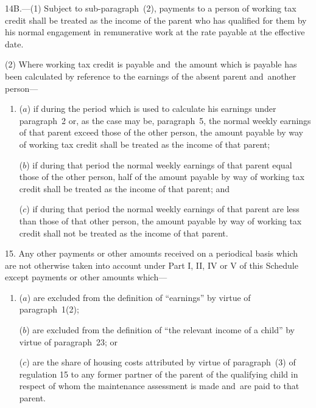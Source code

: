 \documentclass[12pt,a4paper]{article}
\begin{document}

\medskip

14B.---(1)  Subject to sub-paragraph~(2), payments to a person of working tax credit shall be treated as the income of the parent who has qualified for them by his normal engagement in remunerative work at the rate payable at the effective date.

(2) Where working tax credit is payable and~the amount which is payable has been calculated by reference to the earnings of the absent parent and~another person—
\begin{enumerate}\item[]
($a$) if during the period which is used to calculate his earnings under paragraph~2 or, as the case may be, paragraph~5, the normal weekly earnings of that parent exceed those of the other person, the amount payable by way of working tax credit shall be treated as the income of that parent;

($b$) if during that period the normal weekly earnings of that parent equal those of the other person, half of the amount payable by way of working tax credit shall be treated as the income of that parent; and

($c$) if during that period the normal weekly earnings of that parent are less than those of that other person, the amount payable by way of working tax credit shall not be treated as the income of that parent.
\end{enumerate}



\medskip

15.  Any other payments or other amounts received on a periodical basis which are not otherwise taken into account under Part I, II, IV or V of this Schedule
except payments or other amounts which—
\begin{enumerate}\item[]
($a$) are excluded from the definition of “earnings” by virtue of paragraph~1(2);

($b$) are excluded from the definition of “the relevant income of a child” by virtue of paragraph~23; or

($c$) are the share of housing costs attributed by virtue of paragraph~(3) of regulation 15 to any former partner of the parent of the qualifying child in respect of whom the maintenance assessment is made and~are paid to that parent.
\end{enumerate}  %
\end{document}
